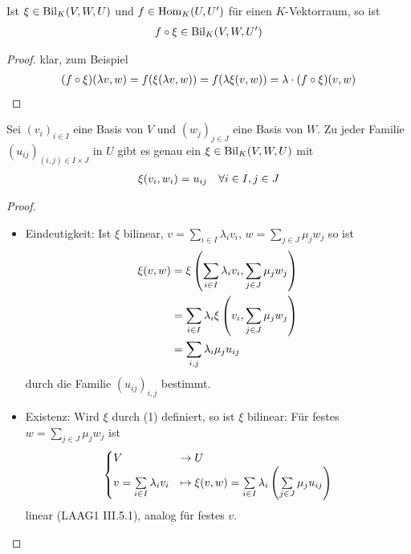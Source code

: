 \begin{lemma}
	Ist $\xi\in\operatorname{Bil}_K(V,W,U)$ und $f\in\operatorname{Hom}_K(U,U')$ für einen $K$-Vektorraum, so ist 
	\begin{align}
		f\circ \xi\in\operatorname{Bil}_K(V,W,U')\notag
	\end{align}
\end{lemma}
\begin{proof}
	klar, zum Beispiel
	\begin{align}
		(f\circ\xi)(\lambda v,w)=f(\xi(\lambda v,w))=f(\lambda\xi(v,w))=\lambda\cdot(f\circ\xi)(v,w)\notag
	\end{align}
\end{proof}

\begin{lemma}
	Sei $(v_i)_{i\in I}$ eine Basis von $V$ und $(w_j)_{j\in J}$ eine Basis von $W$. Zu jeder Familie $(u_{ij})_{(i,j)\in I\times J}$ in $U$ gibt es genau ein $\xi\in\operatorname{Bil}_K(V,W,U)$ mit
	\begin{align}
		\xi(v_i,w_i)=u_{ij}\quad\forall i\in I, j\in J\notag
	\end{align}
\end{lemma}
\begin{proof}
	\begin{itemize}
		\item Eindeutigkeit: Ist $\xi$ bilinear, $v=\sum_{i\in I} \lambda_i v_i$, $w=\sum_{j\in J} \mu_j w_j$ so ist 
		\begin{align}
			\xi(v,w)&=\xi\left(\sum_{i\in I} \lambda_i v_i,\sum_{j\in J}\mu_j w_j\right) \notag \\
			&= \sum_{i\in I}\lambda_i\xi\left(v_i,\sum_{j\in J}\mu_j w_j\right)\notag \\
			&= \sum_{i,j}\lambda_i\mu_j u_{ij}
		\end{align}
		durch die Familie $(u_{ij})_{i,j}$ bestimmt.
		\item Existenz: Wird $\xi$ durch (1) definiert, so ist $\xi$ bilinear: Für festes $w=\sum_{j\in J}\mu_j w_j$ ist
		\begin{align}
			\begin{cases}
			V&\to U \\ v=\sum\limits_{i\in I}\lambda_i v_i&\mapsto \xi(v,w)=\sum\limits_{i\in I}\lambda_i\left(\sum\limits_{j\in J}\mu_j u_{ij}\right)
			\end{cases}\notag
		\end{align}
		linear (LAAG1 III.5.1), analog für festes $v$. %
	\end{itemize}
\end{proof}

